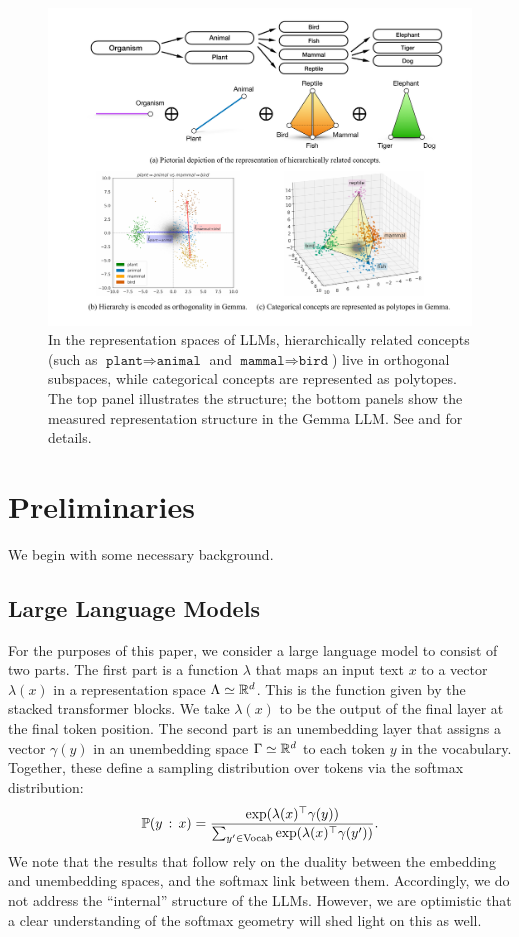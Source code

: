 \documentclass{article}
\newcommand{\ConceptDirName}[2]{\texttt{#1}\Rightarrow\texttt{#2}}
\begin{document}
\begin{figure}[t]
  \centering
  \includegraphics[trim={3cm 0.7cm 1.5cm 1cm}, clip, width=1.0\linewidth]{figures/diagram.pdf}
  \caption{
    In the representation spaces of LLMs, hierarchically related concepts (such as $\ConceptDirName{plant}{animal}$ and $\ConceptDirName{mammal}{bird}$) live in orthogonal subspaces, while categorical concepts are represented as polytopes.
    The top panel illustrates the structure; the bottom panels show the measured representation structure in the Gemma LLM. See  and  for details.}
  \label{fig:diagram}
\end{figure}



\section{Preliminaries}\label{sec:preliminaries}
We begin with some necessary background.
\subsection{Large Language Models}
For the purposes of this paper, we consider a large language model to consist of two parts. 
The first part is a function $\lambda$ that maps an input text $x$ to a vector $\lambda(x)$ in a representation space $\Lambda  \simeq \mathbb{R}^d$. This is the function given by the stacked transformer blocks. We take $\lambda(x)$ to be the output of the final layer at the final token position. The second part is an unembedding layer that assigns a vector $\gamma(y)$ in an unembedding space $\Gamma  \simeq \mathbb{R}^d$ to each token $y$ in the vocabulary. Together, these define a sampling distribution over tokens via the softmax distribution:
\begin{equation}\label{eq:softmax}
  \Pr(y\given x) = \frac{\exp(\lambda(x)^\top \gamma(y))}{\sum_{y' \in \mathrm{Vocab}}\exp(\lambda(x)^\top \gamma(y'))}.
\end{equation}
We note that the results that follow rely on the duality between the embedding and unembedding spaces, and the softmax link between them. Accordingly, we do not address the ``internal'' structure of the LLMs. However, we are optimistic that a clear understanding of the softmax geometry will shed light on this as well.
\end{document}
